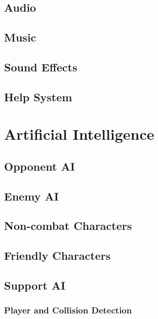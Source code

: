 \documentclass[12pt,titlepage]{article}
\begin{document}
\subsection{Audio}

\subsection{Music}

\subsection{Sound Effects}

\subsection{Help System}

\section{Artificial Intelligence}

\subsection{Opponent AI}

\subsection{Enemy AI}

\subsection{Non-combat Characters}

\subsection{Friendly Characters}

\subsection{Support AI}

\subsubsection{Player and Collision Detection}
\end{document}
